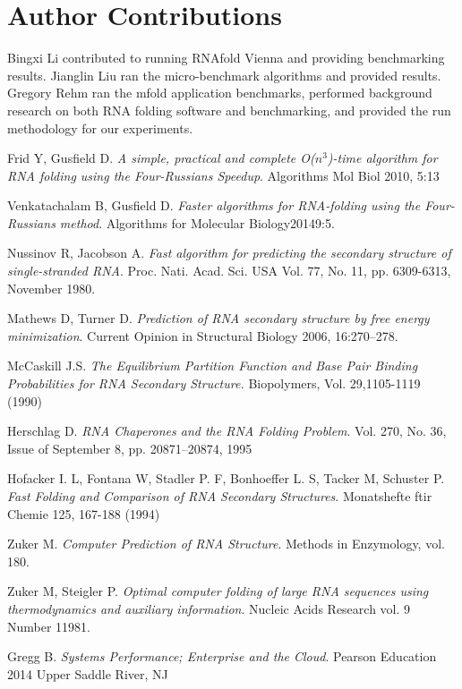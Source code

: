 \documentclass[12pt]{article}
\begin{document}
\section{Author Contributions}
Bingxi Li contributed to running RNAfold Vienna and providing benchmarking results. Jianglin Liu ran the
micro-benchmark algorithms and provided results. Gregory Rehm ran the mfold application benchmarks,
performed background research on both RNA folding software and benchmarking, and provided the run methodology
for our experiments.
\begin{thebibliography}{56}
Frid Y, Gusfield D.
\textit{A simple, practical and complete O($n^3$)-time
algorithm for RNA folding using the Four-Russians Speedup}.
Algorithms Mol Biol 2010, 5:13

Venkatachalam B, Gusfield D.
\textit{Faster algorithms for RNA-folding using the Four-Russians method}.
Algorithms for Molecular Biology20149:5.

Nussinov R, Jacobson A.
\textit{Fast algorithm for predicting the secondary structure of
single-stranded RNA}.
Proc. Nati. Acad. Sci. USA Vol. 77, No. 11, pp. 6309-6313, November 1980.

Mathews D, Turner D.
\textit{Prediction of RNA secondary structure by free energy
minimization}.
Current Opinion in Structural Biology 2006, 16:270–278.

McCaskill J.S.
\textit{The Equilibrium Partition Function and Base Pair
Binding Probabilities for RNA Secondary Structure.}
Biopolymers, Vol. 29,1105-1119 (1990)

Herschlag D.
\textit{RNA Chaperones and the RNA Folding Problem}.
Vol. 270, No. 36, Issue of September 8, pp. 20871–20874, 1995

Hofacker I. L, Fontana W, Stadler P. F, Bonhoeffer L. S, Tacker M, Schuster P.
\textit{Fast Folding and Comparison of RNA Secondary Structures}.
Monatshefte ftir Chemie 125, 167-188 (1994)

Zuker M.
\textit{Computer Prediction of RNA Structure}.
Methods in Enzymology, vol. 180.

Zuker M, Steigler P.
\textit{Optimal computer folding of large RNA sequences using thermodynamics and auxiliary information}.
Nucleic Acids Research vol. 9 Number 11981.

Gregg B.
\textit{Systems Performance; Enterprise and the Cloud}.
Pearson Education 2014 Upper Saddle River, NJ


\end{thebibliography}
\end{document}
